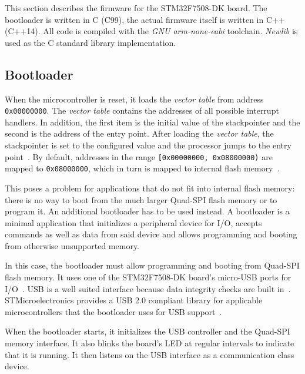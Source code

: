 This section describes the firmware for the STM32F7508-DK board. The bootloader is written in C
(C99), the actual firmware itself is written in C++ (C++14). All code is compiled with the
\textit{GNU arm-none-eabi} toolchain. \textit{Newlib} is used as the C standard library implementation.

\subsection{Bootloader}
\label{implementation/software/bootloader}

When the microcontroller is reset, it loads the \textit{vector table} from address \mbox{\lstinline{0x00000000}.}
The \textit{vector table} contains the addresses of all possible interrupt handlers. In addition, the
first item is the initial value of the stackpointer and the second is the address of the entry point.
After loading the \textit{vector table}, the stackpointer is set to the configured value and the
processor jumps to the entry point~\cite{mcu-ref-manual}. By default, addresses in the range
\lstinline{[0x00000000, 0x08000000)} are mapped to \lstinline{0x08000000}, which in turn is mapped
to internal flash memory~\cite{mcu-ref-manual}.

This poses a problem for applications that do not fit into internal flash memory: there is no way to
boot from the much larger Quad-SPI flash memory or to program it. An additional bootloader has to be
used instead. A bootloader is a minimal application that initializes a peripheral device for I/O,
accepts commands as well as data from said device and allows programming and booting from otherwise
unsupported memory.

In this case, the bootloader must allow programming and booting from Quad-SPI flash memory. It uses
one of the STM32F7508-DK board's micro-USB ports for I/O~\cite{board-user-manual}. USB is a well
suited interface because data integrity checks are built in~\cite{usb-2-spec}. STMicroelectronics
provides a USB 2.0 compliant library for applicable microcontrollers that the bootloader uses for
USB support~\cite{stm32-usb-lib}.

When the bootloader starts, it initializes the USB controller and the Quad-SPI memory interface. It
also blinks the board's LED at regular intervals to indicate that it is running. It then listens on
the USB interface as a communication class device.

